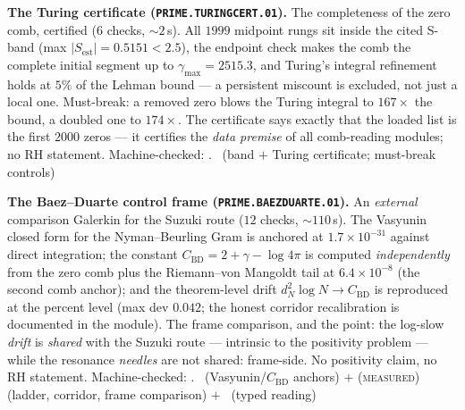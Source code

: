 \documentclass[11pt,a4paper]{article}
\theoremstyle{definition}
\begin{document}
\par\smallskip\noindent\textbf{The Turing certificate
(\texttt{PRIME.TURINGCERT.01}).}
The completeness of the zero comb, certified ($6$ checks,
${\sim}2$\,s).  All $1999$ midpoint rungs sit inside the cited
S-band (max $|S_{\mathrm{est}}|=0.5151<2.5$), the endpoint check
makes the comb the complete initial segment up to
$\gamma_{\max}=2515.3$, and Turing's integral refinement holds at
$5\%$ of the Lehman bound --- a persistent miscount is excluded, not
just a local one.  Must-break: a removed zero blows the Turing
integral to $167\times$ the bound, a doubled one to $174\times$.
The certificate says exactly that the loaded list is the first
$2000$ zeros --- it certifies the \emph{data premise} of all
comb-reading modules; no RH statement.
Machine-checked: .
\mE\ (band $+$ Turing certificate; must-break controls)
\par\smallskip

\par\smallskip\noindent\textbf{The Baez--Duarte control frame
(\texttt{PRIME.BAEZDUARTE.01}).}
An \emph{external} comparison Galerkin for the Suzuki route ($12$
checks, ${\sim}110$\,s).  The Vasyunin closed form for the
Nyman--Beurling Gram is anchored at $1.7\times10^{-31}$ against
direct integration; the constant $C_{\mathrm{BD}}=2+\gamma-\log4\pi$
is computed \emph{independently} from the zero comb plus the
Riemann--von Mangoldt tail at $6.4\times10^{-8}$ (the second comb
anchor); and the theorem-level drift $d_N^2\log N\to
C_{\mathrm{BD}}$ is reproduced at the percent level (max dev
$0.042$; the honest corridor recalibration is documented in the
module).  The frame comparison, and the point: the log-slow
\emph{drift} is \emph{shared} with the Suzuki route --- intrinsic to
the positivity problem --- while the resonance \emph{needles} are
not shared: frame-side.  No positivity claim, no RH statement.
Machine-checked: .
\mE\ (Vasyunin/$C_{\mathrm{BD}}$ anchors) $+$ (\textsc{measured})
(ladder, corridor, frame comparison) $+$ \mC\ (typed reading)
\par\smallskip
\end{document}
